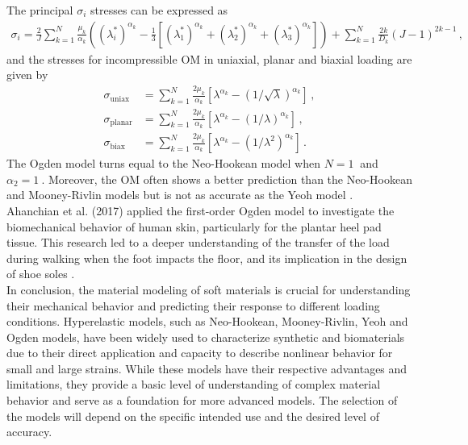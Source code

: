 The principal $\sigma_i$ stresses can be expressed as
\begin{align}
        \sigma_i = \frac{2}{J}\sum_{k=1}^N \frac{\mu_k}{\alpha_k}((\lambda_i^*)^{\alpha_k} - \frac{1}{3}[(\lambda_1^*)^{\alpha_k} + (\lambda_2^*)^{\alpha_k} + (\lambda_3^*)^{\alpha_k}]) + \sum_{k=1}^N \frac{2k}{D_k}(J - 1)^{2k - 1} \,,
\end{align}
and the stresses for incompressible OM in uniaxial, planar and biaxial loading are given by
\begin{align}
        \sigma_{\text{uniax}} &= \sum_{k=1}^N \frac{2\mu_k}{\alpha_k}[\lambda^{\alpha_k} - (1/\sqrt{\lambda})^{\alpha_k}] \,,\\
        \sigma_{\text{planar}} &= \sum_{k=1}^N \frac{2\mu_k}{\alpha_k}[\lambda^{\alpha_k} - (1/\lambda)^{\alpha_k}] \,,\\
        \sigma_{\text{biax}} &= \sum_{k=1}^N \frac{2\mu_k}{\alpha_k}[\lambda^{\alpha_k} - (1/\lambda^2)^{\alpha_k}] \,.
\end{align}
The Ogden model turns equal to the Neo-Hookean model when $N = \SI{1}{}$ and $\alpha_2 = \SI{1}{}$.  
Moreover, the OM often shows a better prediction than the Neo-Hookean and Mooney-Rivlin models but is not as accurate as the 
Yeoh model \cite{Bergström2015}.\\

Ahanchian et al. (2017) applied the first-order Ogden model to investigate the biomechanical behavior of 
human skin, particularly for the plantar heel pad tissue. This research led to a deeper understanding of 
the transfer of the load during walking when the foot impacts the floor,
and its implication in the design of shoe soles \cite{Ahanchian2017}.\\

In conclusion, the material modeling of soft materials is crucial for understanding their mechanical 
behavior and predicting their response to different loading conditions. Hyperelastic models, such as 
Neo-Hookean, Mooney-Rivlin, Yeoh and Ogden models, have been widely used to characterize synthetic and biomaterials 
due to their direct application and capacity to describe nonlinear behavior for small and large strains.
While these models have their respective advantages and limitations, they provide a basic level of understanding of 
complex material behavior and serve as a foundation for more advanced models. The selection of the models 
will depend on the specific intended use and the desired level of accuracy. 

